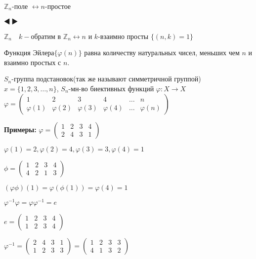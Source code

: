 \documentclass[12pt]{article}
\begin{document}
\begin{Th}\label{thFirst}
	$\mathds{Z}_n$-поле $\leftrightarrow n$-простое 
\end{Th}

$\LHD \RHD$


\begin{Th}\label{thSecond}
	$\mathds{Z}_n \quad k-$обратим в $\mathds{Z}_n \leftrightarrow n$ и $k$-взаимно просты $\bigl\{ (n,k) =1 \bigr\} $
\end{Th}

\begin{Def}
	Функция Эйлера$\bigl\{\varphi (n) \bigr\} $ равна количеству натуральных чисел, меньших чем $n$ и взаимно простых с $n$.
\end{Def}

\begin{Def}
	$S_n$-группа подстановок(так же называют симметричной группой) \\
	$x=\{1,2,3, \dots , n\}$, $S_n$-мн-во биективных функций $\varphi :X\rightarrow X$ \\
	$\varphi= \begin{pmatrix}
	1 & 2 & 3 & 4 & \dots & n \\
	\varphi(1) & \varphi(2) & \varphi(3) & \varphi(4) & \dots & \varphi(n)
	\end{pmatrix}$
\end{Def}

\textbf{Примеры:} $\varphi=\begin{pmatrix}
1 & 2 & 3 & 4 \\
2 & 4 & 3 & 1
\end{pmatrix}$

$ \varphi(1)=2 , \varphi(2)=4, \varphi(3)=3, \varphi(4)=1$

$\phi=\begin{pmatrix}
1 & 2 & 3 & 4 \\
4 & 2 & 1 & 3
\end{pmatrix}$

$(\varphi\phi)(1)=\varphi(\phi(1))=\varphi(4)=1$

$\varphi^{-1}\varphi=\varphi\varphi^{-1}=e$

$e=\begin{pmatrix}
1 & 2 & 3 & 4 \\
1 & 2 & 3 & 4
\end{pmatrix}$

$\varphi^{-1}=\begin{pmatrix}
2 & 4 & 3 & 1 \\
1 & 2 & 3 & 3
\end{pmatrix}=\begin{pmatrix}
1 & 2 & 3 & 3 \\
4 & 1 & 3 & 2 
\end{pmatrix}$
\end{document}
